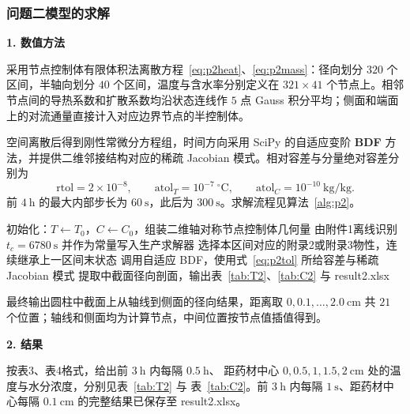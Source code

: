 \documentclass[12pt,a4paper]{ctexart}
\begin{document}
\subsubsection{问题二模型的求解}

\textbf{1. 数值方法}

采用节点控制体有限体积法离散方程~\eqref{eq:p2heat}、\eqref{eq:p2mass}：径向划分 $320$ 个区间，半轴向划分 $40$ 个区间，温度与含水率分别定义在 $321\times41$ 个节点上。相邻节点间的导热系数和扩散系数均沿状态连线作 $5$ 点 Gauss 积分平均；侧面和端面上的对流通量直接计入对应边界节点的半控制体。

空间离散后得到刚性常微分方程组，时间方向采用 SciPy 的自适应变阶 \textbf{BDF} 方法，并提供二维邻接结构对应的稀疏 Jacobian 模式。相对容差与分量绝对容差分别为
\begin{equation}
\mathrm{rtol}=2\times10^{-8},\qquad
\mathrm{atol}_T=10^{-7}\ ^\circ\mathrm{C},\qquad
\mathrm{atol}_C=10^{-10}\ \mathrm{kg/kg}.
\label{eq:p2tol}
\end{equation}
前 $4\ \mathrm{h}$ 的最大内部步长为 $60\ \mathrm{s}$，此后为 $300\ \mathrm{s}$。求解流程见算法~\ref{alg:p2}。

\begin{algorithm}[H]
\caption{问题二完整烘干过程二维轴对称传热--传质数值求解}
\label{alg:p2}
\begin{algorithmic}[1]
\State 初始化：$T\gets T_0$，$C\gets C_0$，组装二维轴对称节点控制体几何量
\State 由附件1离线识别 $t_c=6780\ \mathrm{s}$ 并作为常量写入生产求解器
    \State 选择本区间对应的附录2或附录3物性，连续继承上一区间末状态
    \State 调用自适应 BDF，使用式~\eqref{eq:p2tol} 所给容差与稀疏 Jacobian 模式
\EndFor
\State 提取中截面径向剖面，输出表~\ref{tab:T2}、\ref{tab:C2} 与 result2.xlsx
\end{algorithmic}
\end{algorithm}

最终输出圆柱中截面上从轴线到侧面的径向结果，距离取 $0,0.1,\dots,2.0\ \mathrm{cm}$ 共 $21$ 个位置；轴线和侧面均为计算节点，中间位置按节点值插值得到。

\textbf{2. 结果}

按表3、表4格式，给出前 $3\ \mathrm{h}$ 内每隔 $0.5\ \mathrm{h}$、
距药材中心 $0,0.5,1,1.5,2\ \mathrm{cm}$ 处的温度与水分浓度，分别见表~\ref{tab:T2} 与
表~\ref{tab:C2}。前 $3\ \mathrm{h}$ 内每隔 $1\ \mathrm{s}$、距药材中心每隔 $0.1\ \mathrm{cm}$
的完整结果已保存至 result2.xlsx。
\end{document}
